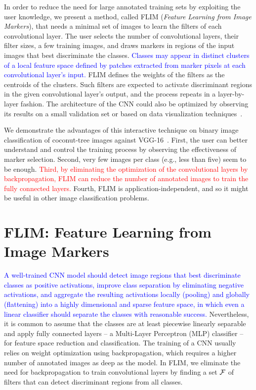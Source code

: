 \documentclass[a4paper,conference]{IEEEtran}
\begin{document}
In order to reduce the need for large annotated training sets by exploiting the user knowledge, we present a method, called FLIM (\emph{Feature Learning from Image Markers}), that needs a minimal set of images to learn the filters of each convolutional layer. The user selects the number of convolutional layers, their filter sizes, a few training images, and draws markers in regions of the input images that best discriminate the classes. \textcolor{blue}{Classes may appear in distinct clusters of a local feature space defined by patches extracted from marker pixels at each convolutional layer's input.} FLIM defines the weights of the filters as the centroids of the clusters. Such filters are expected to activate discriminant regions in the given convolutional layer's output, and the process repeats in a layer-by-layer fashion. The architecture of the CNN could also be optimized by observing its results on a small validation set or based on data visualization techniques~\cite{rauber2016visualizing}.

We demonstrate the advantages of this interactive technique on binary image classification of coconut-tree images against  VGG-16~\cite{simonyan2014very}. First, the user can better understand and control the training process by observing the effectiveness of marker selection.  Second, very few images per class (e.g., less than five) seem to be enough. \textcolor{red}{Third, by eliminating the optimization of the convolutional layers by backpropagation, FLIM can reduce the number of annotated images to train the fully connected layers.} Fourth, FLIM is application-independent, and so it might be useful in other image classification problems.

\section{FLIM: Feature Learning  from Image Markers}
\label{sec:method}
  
\textcolor{blue}{A well-trained CNN model should detect image regions that best discriminate classes as positive activations, improve class separation by eliminating negative activations, and aggregate the resulting activations locally (pooling) and globally (flattening) into a highly dimensional and sparse feature space, in which even a linear classifier should separate the classes with reasonable success.} Nevertheless, it is common to assume that the classes are at least piecewise linearly separable and apply fully connected layers -- a Multi-Layer Perceptron (MLP) classifier -- for feature space reduction and classification. The training of a CNN usually relies on weight optimization using backpropagation, which requires a higher number of annotated images as deep as the model. In FLIM, we eliminate the need for backpropagation to train convolutional layers by finding a set ${\cal F}$ of filters that can detect discriminant regions from all classes.
\end{document}
